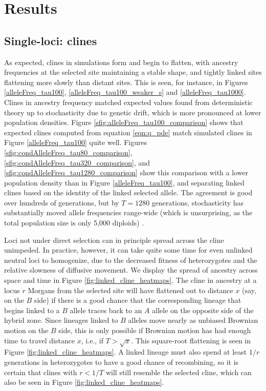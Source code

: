 \documentclass[11pt,letterpaper]{article}
\begin{document}
\section*{Results}


\subsection*{Single-loci: clines}

As expected, clines in simulations form and begin to flatten, 
with ancestry frequencies at the selected site maintaining a stable shape,
and tightly linked sites flattening more slowly than distant sites.
This is seen, for instance, in Figures \ref{alleleFreq_tau100},
\ref{alleleFreq_tau100_weaker_s} and \ref{alleleFreq_tau1000}. 
Clines in ancestry frequency matched expected values found from deterministic theory
up to stochasticity due to genetic drift, which is more pronounced at lower population densities.
Figure \ref{sfig:alleleFreq_tau100_comparison} shows that expected clines computed from equation \eqref{eqn:q_pde}
match simulated clines in Figure \ref{alleleFreq_tau100} quite well.
Figures \ref{sfig:condAlleleFreq_tau80_comparison}, \ref{sfig:condAlleleFreq_tau320_comparison}, and \ref{sfig:condAlleleFreq_tau1280_comparison}
show this comparison with a lower population density than in Figure \ref{alleleFreq_tau100},
and separating linked clines based on the identity of the linked selected allele.
The agreement is good over hundreds of generations, but by $T=1280$ generations,
stochasticity has substantially moved allele frequencies range-wide
(which is unsurprising, as the total population size is only 5,000 diploids) \citep{Polechova2011}.


Loci not under direct selection can in principle spread across the cline unimpeded. 
In practice, however, it can take quite some time for even unlinked neutral loci to homogenize,
due to the decreased fitness of heterozygotes \citep{Barton1986}
and the relative slowness of diffusive movement.
We display the spread of ancestry across space and time in Figure \ref{fig:linked_cline_heatmaps}. 
The cline in ancestry at a locus $r$ Morgans from the selected site
will have flattened out to distance $x$ (say, on the $B$ side)
if there is a good chance that the corresponding lineage that begins linked to a $B$ allele
traces back to an $A$ allele on the opposite side of the hybrid zone.
Since lineages linked to $B$ alleles move nearly as unbiased Brownian motion on the $B$ side,
this is only possible if Brownian motion has had enough time to travel distance $x$,
i.e., if $T>\sqrt{x}$.
This square-root flattening is seen in Figure \ref{fig:linked_cline_heatmaps}.
A linked lineage must also spend at least $1/r$ generations in heterozygotes
to have a good chance of recombining,
so it is certain that clines with $r<1/T$ will still resemble the selected cline,
which can also be seen in Figure \ref{fig:linked_cline_heatmaps}.
\end{document}
